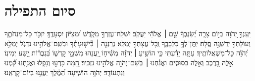 \documentclass[twoside, openany, parskip=half, 11pt]{book}
\begin{document}
\negline
\kafdalet


\etzchaim




\nextpage

\section[סיום התפילה]{ סיום התפילה }
\label{ashrei}
\ashrei



יַֽעַנְךָ֣ יְ֭הֹוָה בְּי֣וֹם צָרָ֑ה יְ֝שַׂגֶּבְךָ֗ שֵׁ֤ם ׀ אֱלֹהֵ֬י יַעֲקֹֽב׃
יִשְׁלַֽח־עֶזְרְךָ֥ מִקֹּ֑דֶשׁ וּ֝מִצִּיּ֗וֹן יִסְעָדֶֽךָּ׃
יִזְכֹּ֥ר כׇּל־מִנְחֹתֶ֑ךָ וְעוֹלָתְךָ֖ יְדַשְּׁנֶ֣ה סֶֽלָה׃
יִֽתֶּן־לְךָ֥ כִלְבָבֶ֑ךָ וְֽכׇל־עֲצָתְךָ֥ יְמַלֵּֽא׃
נְרַנְּנָ֤ה ׀ בִּ֘ישׁ֤וּעָתֶ֗ךָ וּבְשֵֽׁם־אֱלֹהֵ֥ינוּ נִדְגֹּ֑ל יְמַלֵּ֥א יְ֝הֹוָ֗ה כׇּל־מִשְׁאֲלוֹתֶֽיךָ׃
עַתָּ֤ה יָדַ֗עְתִּי כִּ֤י הוֹשִׁ֥יעַ ׀ יְהֹוָ֗ה מְשִׁ֫יח֥וֹ יַ֭עֲנֵהוּ מִשְּׁמֵ֣י קׇדְשׁ֑וֹ בִּ֝גְבֻר֗וֹת יֵ֣שַׁע יְמִינֽוֹ׃
אֵ֣לֶּה בָ֭רֶכֶב וְאֵ֣לֶּה בַסּוּסִ֑ים וַאֲנַ֓חְנוּ ׀ בְּשֵׁם־יְהֹוָ֖ה אֱלֹהֵ֣ינוּ נַזְכִּֽיר׃
הֵ֭מָּה כָּרְע֣וּ וְנָפָ֑לוּ וַאֲנַ֥חְנוּ קַּ֝֗מְנוּ וַנִּתְעוֹדָֽד׃
יְהֹוָ֥ה הוֹשִׁ֑יעָה הַ֝מֶּ֗לֶךְ יַעֲנֵ֥נוּ בְיוֹם־קׇרְאֵֽנוּ׃ 
\end{document}
